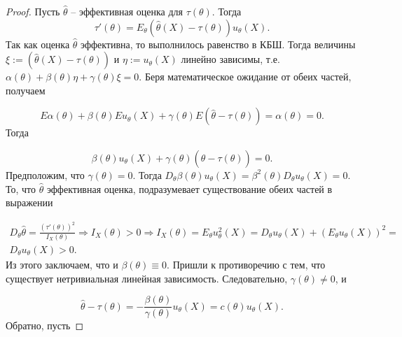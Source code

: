 \begin{proof}
Пусть $\displaystyle \hat{\theta }$ -- эффективная оценка для $\displaystyle \tau ( \theta )$. Тогда
\begin{equation*}
\tau '( \theta ) =E_{\theta }(\hat{\theta }( X) -\tau ( \theta )) u_{\theta }( X) .
\end{equation*}
Так как оценка $\displaystyle \hat{\theta }$ эффективна, то выполнилось равенство в КБШ. Тогда величины $\displaystyle \xi :=(\hat{\theta }( X) -\tau ( \theta ))$ и $\displaystyle \eta :=u_{\theta }( X)$ линейно зависимы, т.е. $\displaystyle \alpha ( \theta ) +\beta ( \theta ) \eta +\gamma ( \theta ) \xi =0$. Беря математическое ожидание от обеих частей, получаем


\begin{equation*}
E\alpha ( \theta ) + \beta ( \theta ) Eu_{\theta }( X) + \gamma ( \theta ) E(\hat{\theta } -\tau ( \theta )) =\alpha ( \theta ) =0.
\end{equation*}
Тогда


\begin{equation*}
\beta ( \theta ) u_{\theta }( X) +\gamma ( \theta )(\hat{\theta } -\tau ( \theta )) = 0.
\end{equation*}
Предположим, что $\displaystyle \gamma ( \theta ) = 0$. Тогда $\displaystyle D_{\theta } \beta ( \theta ) u_{\theta }( X) =\beta ^{2}( \theta ) D_{\theta } u_{\theta }( X) =0$. То, что $\displaystyle \hat{\theta }$ эффективная оценка, подразумевает существование обеих частей в выражении


\begin{gather*}
D_{\theta }\hat{\theta } =\frac{( \tau '( \theta ))^{2}}{I_{X}( \theta )} \Rightarrow I_{X}( \theta )  >0\Rightarrow I_{X}( \theta ) =E_{\theta } u_{\theta }^{2}( X) =D_{\theta } u_{\theta }( X) +( E_{\theta } u_{\theta }( X))^{2} =\\
D_{\theta } u_{\theta }( X)  >0.
\end{gather*}
Из этого заключаем, что и $\displaystyle \beta ( \theta ) \equiv 0$. Пришли к противоречию с тем, что существует нетривиальная линейная зависимость. Следовательно, $\displaystyle \gamma ( \theta ) \neq 0$, и


\begin{equation*}
\hat{\theta } -\tau ( \theta ) =-\frac{\beta ( \theta )}{\gamma ( \theta )} u_{\theta }( X) =c( \theta ) u_{\theta }( X) .
\end{equation*}
Обратно, пусть



\end{proof}
